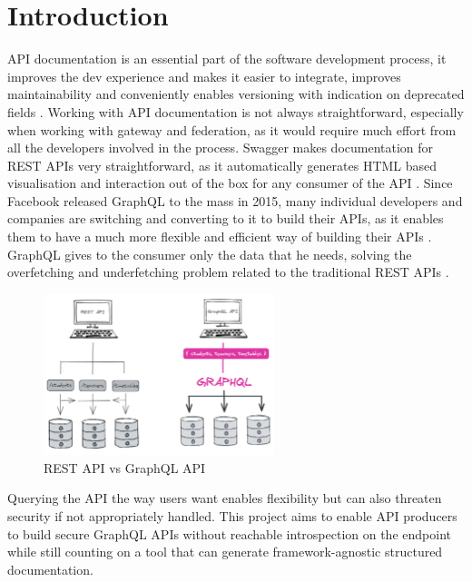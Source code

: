 \section*{Introduction}
\label{s:Introduction}
API documentation is an essential part of the software development process, it
improves the dev experience and makes it easier to integrate, improves
maintainability and conveniently enables versioning with indication on
deprecated fields \citep{fanWhyAPIDocumentation2021}. Working with API
documentation is not always straightforward, especially when working with
gateway and federation, as it would require much effort from all the developers
involved in the process. Swagger makes documentation for REST APIs very
straightforward, as it automatically generates HTML based visualisation and
interaction out of the box for any consumer of the API
\citep{korenExploitationOpenAPIDocumentation2018}. Since Facebook released
GraphQL to the mass in 2015, many individual developers and companies are
switching and converting to it to build their APIs, as it enables them to have a
much more flexible and efficient way of building their APIs
\citep{britoRESTVsGraphQL2020}. GraphQL gives to the consumer only the data that
he needs, solving the overfetching and underfetching problem related to the
traditional REST APIs \citep{witternGeneratingGraphQLWrappersREST2018}.
\begin{figure}[H]
  \centering
  \includegraphics[width=0.6\textwidth]{figures/restvsgraph}
  \caption{REST API vs GraphQL API}
  \label{f:restvsgraph}
\end{figure}
Querying the API the way users want enables flexibility but can also threaten
security if not appropriately handled. This project aims to enable API producers
to build secure GraphQL APIs without reachable introspection on the endpoint
while still counting on a tool that can generate framework-agnostic structured
documentation.

